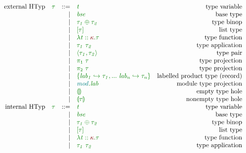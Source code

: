\documentclass[12pt,fleqn]{article}
\newcommand{\red}[1]{\textcolor{red}{#1}}
\newcommand{\green}[1]{\textcolor{green}{#1}}
\newcommand{\teal}[1]{\textcolor{teal}{#1}}
\newcommand{\greentt}[1]{\green{\mathtt{#1}}}
\newcommand{\redit}[1]{\red{\mathit{#1}}}
\newcommand{\greenit}[1]{\green{\mathit{#1}}}
\newcommand{\tealit}[1]{\teal{\mathit{#1}}}
\newcommand{\knd}[1][]{\redit{\kappa#1}}
\newcommand{\typ}[1][]{\greenit{\tau#1}}
\newcommand{\typvar}[1][]{\greenit{t#1}}
\renewcommand{\mod}[1][]{\tealit{mod#1}}
\newcommand{\lab}[1][]{\mathit{lab#1}}
\newcommand{\TypCFun}[2]{\greentt{\lambda #1.#2}}
\newcommand{\TypCAp}[2]{\greentt{#1~#2}}
\newcommand{\TypCPair}[2]{\greentt{\langle #1, #2\rangle}}
\newcommand{\TypCPairPrjL}[1]{\greentt{\pi_1~#1}}
\newcommand{\TypCPairPrjR}[1]{\greentt{\pi_2~#1}}
\newcommand{\ListTyp}[1]{\greentt{[#1]}}
\newcommand{\TypCHole}[1][]{\greentt{\llparenthesis #1 \rrparenthesis}}
\begin{document}
\[\begin{array}{rcrlr}
    \textrm{external HTyp} & \typ & ::=
                           & \typvar & \textrm{type variable} \\
                           && \vert & \greenit{bse} & \textrm{base type} \\
                           && \vert & \greentt{\typ[_1] \oplus \typ[_2]} & \textrm{type binop} \\
                           && \vert & \ListTyp{\typ} & \textrm{list type} \\
                           && \vert & \TypCFun{\typvar::\knd}{\typ} & \textrm{type function} \\
                           && \vert & \TypCAp{\typ[_1]}{\typ[_2]} & \textrm{type application} \\
                           && \vert & \TypCPair{\typ[_1]}{\typ[_2]} & \textrm{type pair} \\
                           && \vert & \TypCPairPrjL{\typ} & \textrm{type projection} \\
                           && \vert & \TypCPairPrjR{\typ} & \textrm{type projection} \\
                           && \vert & \greentt{\{\lab[_1] \hookrightarrow \typ[_1], ...~\lab[_n] \hookrightarrow \typ[_n]\}} & \textrm{labelled product type (record)} \\
                           && \vert & \greentt{\mod.\lab} & \textrm{module type projection} \\
                           && \vert & \TypCHole & \textrm{empty type hole} \\
                           && \vert & \TypCHole[\typ] & \textrm{nonempty type hole} \\
    \textrm{internal HTyp} & \typ & ::=
                           & \typvar & \textrm{type variable} \\
                           && \vert & \greenit{bse} & \textrm{base type} \\
                           && \vert & \greentt{\typ[_1] \oplus \typ[_2]} & \textrm{type binop} \\
                           && \vert & \ListTyp{\typ} & \textrm{list type} \\
                           && \vert & \TypCFun{\typvar::\knd}{\typ} & \textrm{type function} \\
                           && \vert & \TypCAp{\typ[_1]}{\typ[_2]} & \textrm{type application} \\

\end{array}\]
\end{document}
